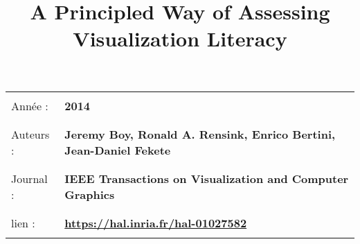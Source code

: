 \documentclass[10pt]{article}
\begin{document}
\title{A Principled Way of Assessing Visualization Literacy}
\maketitle

\begin{tabular}{| l l |}
\hline 

& \\ 
Année : & \textbf{2014} \\
& \\ 
& \\ 
Auteurs : & \textbf{Jeremy Boy, Ronald A. Rensink, Enrico Bertini, Jean-Daniel Fekete} \\
& \\ 
& \\ 
Journal : & \textbf{IEEE Transactions on Visualization and Computer Graphics} \\
& \\ 
& \\ 
lien : & \textbf{\href{https://hal.inria.fr/hal-01027582}{https://hal.inria.fr/hal-01027582 }} \\
& \\ 
\hline
\end{tabular}
\end{document}

